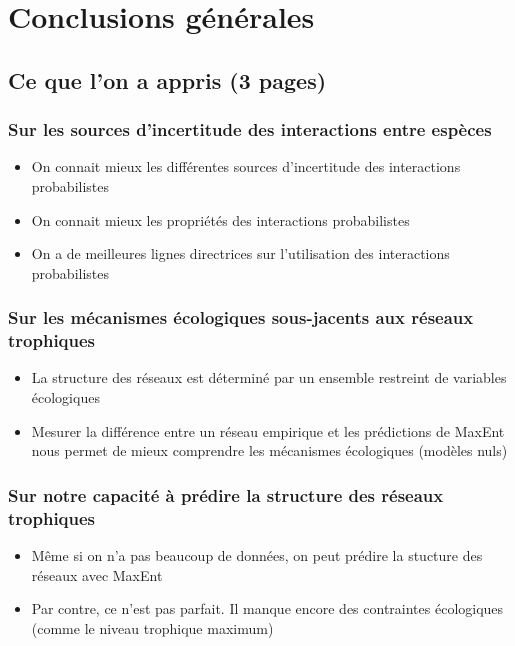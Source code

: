 
\francais   
\chapter*{Conclusions générales}

\section{Ce que l'on a appris (3 pages)}

\subsection{Sur les sources d'incertitude des interactions entre espèces} 

\begin{itemize}
    \item On connait mieux les différentes sources d'incertitude des interactions probabilistes 
    \item On connait mieux les propriétés des interactions probabilistes 
    \item On a de meilleures lignes directrices sur l'utilisation des interactions probabilistes
\end{itemize}

\subsection{Sur les mécanismes écologiques sous-jacents aux réseaux trophiques} 

\begin{itemize}
    \item La structure des réseaux est déterminé par un ensemble restreint de variables écologiques
    \item Mesurer la différence entre un réseau empirique et les prédictions de MaxEnt nous permet de mieux comprendre les mécanismes écologiques (modèles nuls)
\end{itemize}


\subsection{Sur notre capacité à prédire la structure des réseaux trophiques} 

\begin{itemize}
    \item Même si on n'a pas beaucoup de données, on peut prédire la stucture des réseaux avec MaxEnt
    \item Par contre, ce n'est pas parfait. Il manque encore des contraintes écologiques (comme le niveau trophique maximum)
\end{itemize}

